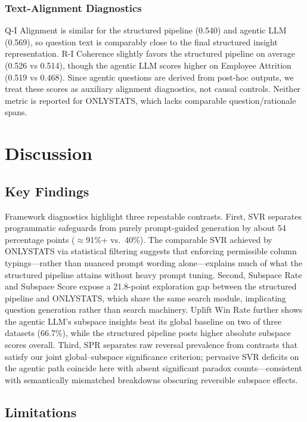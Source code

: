\documentclass[conference]{IEEEtran}
\begin{document}
\subsubsection{Text-Alignment Diagnostics}

Q-I Alignment is similar for the structured pipeline (0.540) and agentic LLM (0.569), so question text is comparably close to the final structured insight representation. R-I Coherence slightly favors the structured pipeline on average (0.526 vs 0.514), though the agentic LLM scores higher on Employee Attrition (0.519 vs 0.468). Since agentic questions are derived from post-hoc outputs, we treat these scores as auxiliary alignment diagnostics, not causal controls. Neither metric is reported for ONLYSTATS, which lacks comparable question/rationale spans.

\section{Discussion}

\subsection{Key Findings}

Framework diagnostics highlight three repeatable contrasts. First, SVR separates programmatic safeguards from purely prompt-guided generation by about 54 percentage points (\(\approx\)91\%+ vs.\ 40\%). The comparable SVR achieved by ONLYSTATS via statistical filtering suggests that enforcing permissible column typings---rather than nuanced prompt wording alone---explains much of what the structured pipeline attains without heavy prompt tuning. Second, Subspace Rate and Subspace Score expose a 21.8-point exploration gap between the structured pipeline and ONLYSTATS, which share the same search module, implicating question generation rather than search machinery. Uplift Win Rate further shows the agentic LLM's subspace insights beat its global baseline on two of three datasets (66.7\%), while the structured pipeline posts higher absolute subspace scores overall. Third, SPR separates raw reversal prevalence from contrasts that satisfy our joint global--subspace significance criterion; pervasive SVR deficits on the agentic path coincide here with absent significant paradox counts---consistent with semantically mismatched breakdowns obscuring reversible subspace effects.

\subsection{Limitations}
\end{document}
